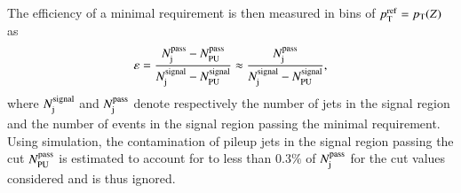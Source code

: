 \documentclass{atlasnote}
\begin{document}
The efficiency of a minimal \JVT requirement is then measured in bins of $p_{\mathrm{T}}^{\rm ref} = p_{\mathrm{T}}(Z)$ as
\begin{eqnarray}
    \varepsilon = \frac{N_{\rm j}^{\rm pass} - N_{\rm PU}^{\rm pass}}{N_{\rm j}^{\rm signal} - N_{{\rm PU}}^{\rm signal}} 
                  \approx 
                  \frac{N_{\rm j}^{\rm pass}}{N_{\rm j}^{\rm signal} - N_{{\rm PU}}^{\rm signal}},
\end{eqnarray}
where $N_{\rm j}^{\rm signal}$ and $N_{\rm j}^{\rm pass}$ denote respectively the number of jets in the signal region and the number of events in the signal region passing the minimal
\JVT requirement. Using simulation, the contamination of pileup jets in the signal region passing the \JVT cut $N_{\rm PU}^{\rm pass}$ is estimated to account for
to less than $0.3\%$ of $N_{\rm j}^{\rm pass}$ for the \JVT cut values considered and is thus ignored. 
\end{document}
